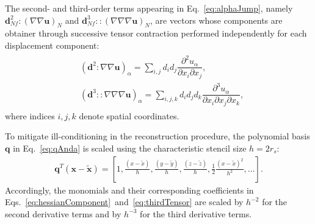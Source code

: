 \documentclass[review,3p]{elsarticle}
\newcommand{\bb}{\boldsymbol}
\begin{document}
The second- and third-order terms appearing in Eq.~\eqref{eq:alphaJump}, namely $\bb{d}_{Nf}^2 \!:\! (\nabla \nabla \bb{u})_N$ and $\bb{d}_{Nf}^3 \!::\! (\nabla \nabla \nabla \bb{u})_N$, are vectors whose components are obtainer through successive tensor contraction performed independently for each displacement component:
%
\begin{eqnarray}
	\begin{split}
		&\left(\bb{d}^2 \!:\! \nabla \nabla \bb{u} \right)_{\alpha} = \sum_{i,j} d_i d_j \dfrac{\partial^2 u_{\alpha}}{\partial x_i \partial x_j}, \\
		& \left(\bb{d}^3 \!::\! \nabla \nabla \nabla \bb{u} \right)_{\alpha} = \sum_{i,j,k} d_i d_j d_k \dfrac{\partial^3 u_{\alpha}}{\partial x_i \partial x_j \partial x_k},
	\end{split}
\end{eqnarray}
where indices $i,j,k$ denote spatial coordinates.

To mitigate ill-conditioning in the reconstruction procedure, the polynomial basis $\mathbf{q}$ in Eq.~\eqref{eq:qAnda} is scaled using the characteristic stencil size $h = 2r_s$:
\begin{eqnarray}
	\mathbf{q}^T(\bb{x}-\tilde{\bb{x}}) = \left[1, \frac{(x-\tilde{x})}{h}, \frac{(y-\tilde{y})}{h}, \frac{(z-\tilde{z})}{h}, \frac{1}{2}\frac{(x-\tilde{x})^2}{h^2}, \dots \right].
\end{eqnarray}
Accordingly, the monomials and their corresponding coefficients in Eqs.~\eqref{eq:hessianComponent}~and~\eqref{eq:thirdTensor} are scaled by $h^{-2}$ for the second derivative terms and by $h^{-3}$ for the third derivative terms.
%
%
%
\end{document}
